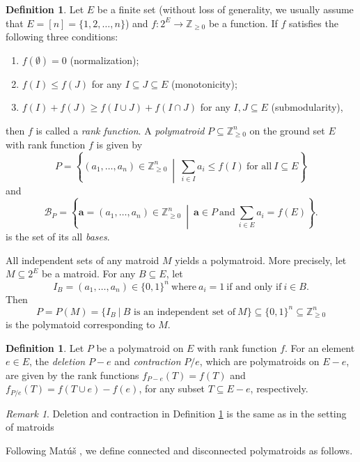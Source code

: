 \documentclass[preprint,10pt]{elsarticle}
\theoremstyle{plain}
\theoremstyle{definition}
\newtheorem{definition}[theorem]{Definition}
\theoremstyle{remark}
\newtheorem{remark}[theorem]{Remark}
\begin{document}
\begin{definition}\label{polymatroid}
Let $E$ be a finite set (without loss of generality, we usually assume that $E=[n]=\{1,2,\ldots,n\}$) and $f:2^{E}\rightarrow \mathbb{Z}_{\geq 0}$ be a function. If $f$ satisfies the following three conditions:

\begin{enumerate}
\item[(i)] $f(\emptyset)=0$ (normalization);
\item[(ii)] $f(I)\leq f(J)$ for any $I\subseteq J\subseteq E$ (monotonicity);
\item[(iii)] $f(I)+f(J)\geq f(I\cup J)+f(I\cap J)$ for any $I,J\subseteq E$ (submodularity),
\end{enumerate}
then $f$ is called a \emph{rank function}. A \emph{polymatroid} $P\subseteq \mathbb{Z}^{n}_{\geq 0}$ on the ground set $E$ with rank function $f$ is given by
$$P=\left\{(a_{1},\ldots,a_{n})\in \mathbb{Z}^{n}_{\geq 0}~\middle|~\sum_{i\in I}a_{i}\leq f(I) \ \text{for all}\ I\subseteq E\right\}$$
and
$$\mathcal{B}_{P}=\left\{\textbf{a}=(a_{1},\ldots,a_{n})\in \mathbb{Z}^{n}_{\geq 0}~\middle|~\textbf{a}\in P \ \text{and} \ \sum_{i\in E}a_{i}=f(E)\right\}.$$
is the set of its all \emph{bases}.
\end{definition}



All independent sets of any matroid $M$ yields a polymatroid.
 More precisely, let $M\subseteq 2^{E}$ be a matroid. For any $B\subseteq E$, let
 $$I_{B}=(a_{1},\ldots,a_{n})\in \{0,1\}^{n}\ \text{where}\ a_{i}=1 \ \text{if and only if}\  i\in B.$$ Then
$$P=P(M)=\{I_{B} ~|~\text{$B$ is an independent set of} \ M\}\subseteq \{0,1\}^{n}\subseteq \mathbb{Z}^{n}_{\geq 0}$$ is the polymatoid corresponding to $M$.
\begin{definition}\label{del-con}
Let $P$ be a polymatroid on $E$ with rank function $f$. For an element $e\in E$, the \emph{deletion} $P-e$ and \emph{contraction} $P/e$, which are polymatroids on $E-e$, are given by the rank functions $f_{P-e}(T)=f(T)$ and $f_{P/e}(T)=f(T\cup e)-f(e)$, for any subset $T\subseteq E-e$, respectively.
\end{definition}

\begin{remark}
Deletion and contraction in Definition \ref{del-con} is the same as in the setting of matroids
\end{remark}


Following Mat\'{u}\v{s} \cite{Matus}, we define connected and disconnected polymatroids as follows.
\end{document}
